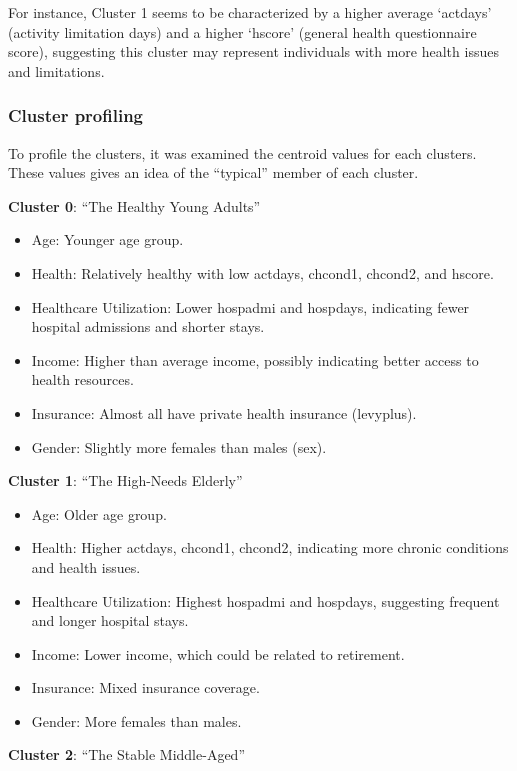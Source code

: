 \documentclass[
]{article}
\providecommand{\tightlist}{%
  \setlength{\itemsep}{0pt}\setlength{\parskip}{0pt}}
\begin{document}
For instance, Cluster 1 seems to be characterized by a higher average
`actdays' (activity limitation days) and a higher `hscore' (general
health questionnaire score), suggesting this cluster may represent
individuals with more health issues and limitations.

\subsubsection{Cluster profiling}\label{cluster-profiling}

To profile the clusters, it was examined the centroid values for each
clusters. These values gives an idea of the ``typical'' member of each
cluster.

\textbf{Cluster 0}: ``The Healthy Young Adults''

\begin{itemize}
\tightlist
\item
  Age: Younger age group.
\item
  Health: Relatively healthy with low actdays, chcond1, chcond2, and
  hscore.
\item
  Healthcare Utilization: Lower hospadmi and hospdays, indicating fewer
  hospital admissions and shorter stays.
\item
  Income: Higher than average income, possibly indicating better access
  to health resources.
\item
  Insurance: Almost all have private health insurance (levyplus).
\item
  Gender: Slightly more females than males (sex).
\end{itemize}

\textbf{Cluster 1}: ``The High-Needs Elderly''

\begin{itemize}
\tightlist
\item
  Age: Older age group.
\item
  Health: Higher actdays, chcond1, chcond2, indicating more chronic
  conditions and health issues.
\item
  Healthcare Utilization: Highest hospadmi and hospdays, suggesting
  frequent and longer hospital stays.
\item
  Income: Lower income, which could be related to retirement.
\item
  Insurance: Mixed insurance coverage.
\item
  Gender: More females than males.
\end{itemize}

\textbf{Cluster 2}: ``The Stable Middle-Aged''
\end{document}
